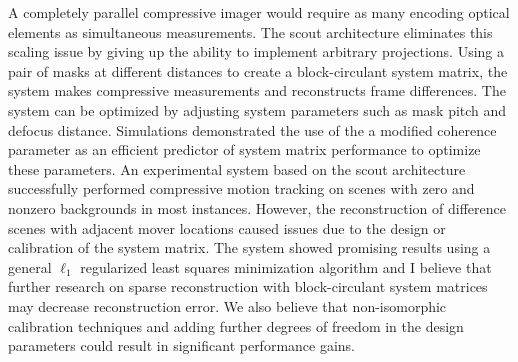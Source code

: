 A completely parallel compressive imager would require as many encoding optical elements as simultaneous measurements. The \gls{scout} architecture eliminates this scaling issue by giving up the ability to implement arbitrary projections. Using a pair of masks at different distances to create a block-circulant system matrix, the system makes compressive measurements and reconstructs frame differences. The system can be optimized by adjusting system parameters such as mask pitch and defocus distance. Simulations demonstrated the use of the a modified coherence parameter as an efficient predictor of system matrix performance to optimize these parameters. An experimental system based on the \gls{scout} architecture successfully performed compressive motion tracking on scenes with zero and nonzero backgrounds in most instances. However, the reconstruction of difference scenes with adjacent mover locations caused issues due to the design or calibration of the system matrix. The system showed promising results using a general $\ell_1$ regularized least squares minimization algorithm and I believe that further research on sparse reconstruction with block-circulant system matrices may decrease reconstruction error. We also believe that non-isomorphic calibration techniques and adding further degrees of freedom in the design parameters could result in significant performance gains.




